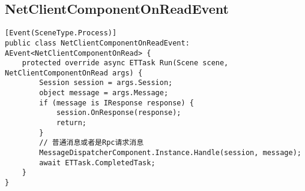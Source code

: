 \documentclass[9pt, b5paper]{article}
\begin{document}
\subsection{NetClientComponentOnReadEvent}
\label{sec-1-7}
\begin{verbatim}
[Event(SceneType.Process)]
public class NetClientComponentOnReadEvent: AEvent<NetClientComponentOnRead> {
    protected override async ETTask Run(Scene scene, NetClientComponentOnRead args) {
        Session session = args.Session;
        object message = args.Message;
        if (message is IResponse response) {
            session.OnResponse(response);
            return;
        }
        // 普通消息或者是Rpc请求消息
        MessageDispatcherComponent.Instance.Handle(session, message);
        await ETTask.CompletedTask;
    }
}
\end{verbatim}
\end{document}
